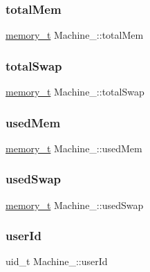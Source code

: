 \subsubsection{\texorpdfstring{total\+Mem}{totalMem}}
{\footnotesize\ttfamily \hyperlink{Machine_8h_ac8c2c5995f64727051f4034a810e5b07}{memory\+\_\+t} Machine\+\_\+\+::total\+Mem}

\mbox{\label{structMachine___ac5c410ad1faf68a90c4acb4200919dda}} 
\subsubsection{\texorpdfstring{total\+Swap}{totalSwap}}
{\footnotesize\ttfamily \hyperlink{Machine_8h_ac8c2c5995f64727051f4034a810e5b07}{memory\+\_\+t} Machine\+\_\+\+::total\+Swap}

\mbox{\label{structMachine___a4ea930fbf9a49f8db13597a7af6d7320}} 
\subsubsection{\texorpdfstring{used\+Mem}{usedMem}}
{\footnotesize\ttfamily \hyperlink{Machine_8h_ac8c2c5995f64727051f4034a810e5b07}{memory\+\_\+t} Machine\+\_\+\+::used\+Mem}

\mbox{\label{structMachine___a68798d7c133548a9a28718f2e51d4cd8}} 
\subsubsection{\texorpdfstring{used\+Swap}{usedSwap}}
{\footnotesize\ttfamily \hyperlink{Machine_8h_ac8c2c5995f64727051f4034a810e5b07}{memory\+\_\+t} Machine\+\_\+\+::used\+Swap}

\mbox{\label{structMachine___a045036b9cd773bfb4134415ee50c299f}} 
\subsubsection{\texorpdfstring{user\+Id}{userId}}
{\footnotesize\ttfamily uid\+\_\+t Machine\+\_\+\+::user\+Id}

